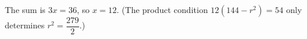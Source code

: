 The sum is $3x=36$, so $x=\boxed{12}$. (The product condition $12(144-r^2)=54$ only determines $r^2=\dfrac{279}{2}$.)
